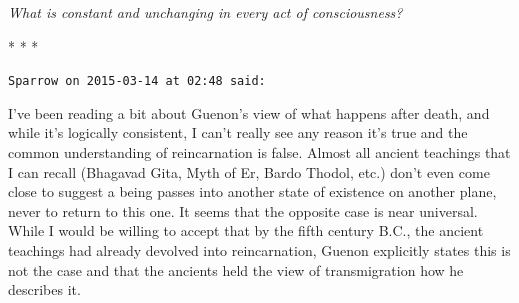 \textit{What is constant and unchanging in every act of consciousness?}


\begin{center}* * *\end{center}

\begin{footnotesize}\begin{sffamily}



\texttt{Sparrow on 2015-03-14 at 02:48 said: }

I've been reading a bit about Guenon's view of what happens after death, and while it's logically consistent, I can't really see any reason it's true and the common understanding of reincarnation is false. Almost all ancient teachings that I can recall (Bhagavad Gita, Myth of Er, Bardo Thodol, etc.) don't even come close to suggest a being passes into another state of existence on another plane, never to return to this one. It seems that the opposite case is near universal. While I would be willing to accept that by the fifth century B.C., the ancient teachings had already devolved into reincarnation, Guenon explicitly states this is not the case and that the ancients held the view of transmigration how he describes it.


\end{sffamily}\end{footnotesize}
